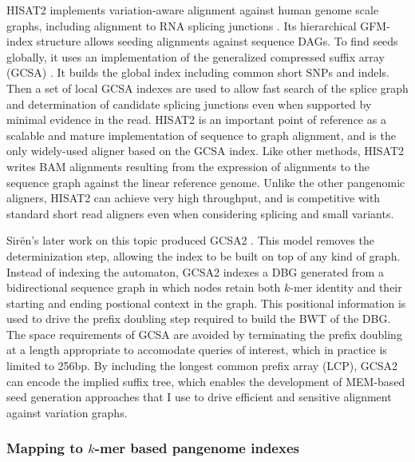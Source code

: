 HISAT2 implements variation-aware alignment against human genome scale graphs, including alignment to RNA splicing junctions \cite{kim2017hisat2}.
Its hierarchical GFM-index structure allows seeding alignments against sequence DAGs.
To find seeds globally, it uses an implementation of the generalized compressed suffix array (GCSA) \cite{siren2011indexing}.
It builds the global index including common short SNPs and indels.
Then a set of local GCSA indexes are used to allow fast search of the splice graph and determination of candidate splicing junctions even when supported by minimal evidence in the read.
HISAT2 is an important point of reference as a scalable and mature implementation of sequence to graph alignment, and is the only widely-used aligner based on the GCSA index.
Like other methods, HISAT2 writes BAM alignments resulting from the expression of alignments to the sequence graph against the linear reference genome.
Unlike the other pangenomic aligners, HISAT2 can achieve very high throughput, and is competitive with standard short read aligners even when considering splicing and small variants.

Sir\"{e}n's later work on this topic produced GCSA2 \cite{siren2017indexing}.
This model removes the determinization step, allowing the index to be built on top of any kind of graph.
Instead of indexing the automaton, GCSA2 indexes a DBG generated from a bidirectional sequence graph in which nodes retain both $k$-mer identity and their starting and ending postional context in the graph.
This positional information is used to drive the prefix doubling step required to build the BWT of the DBG.
The space requirements of GCSA are avoided by terminating the prefix doubling at a length appropriate to accomodate queries of interest, which in practice is limited to 256bp.
By including the longest common prefix array (LCP), GCSA2 can encode the implied suffix tree, which enables the development of MEM-based seed generation approaches that I use to drive efficient and sensitive alignment against variation graphs.

\subsubsection{Mapping to $k$-mer based pangenome indexes}

